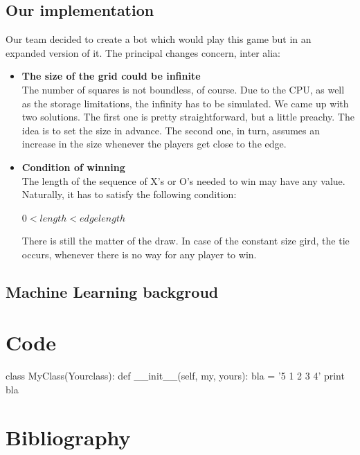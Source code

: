 \documentclass[a4paper,12pt]{book}
\begin{document}
	\section{Our implementation}
	Our team decided to create a bot which would play this game but in an expanded version of it. The principal changes concern, inter alia:\\
	\begin{itemize}
		\item \textbf{The size of the grid could be infinite}\\
		The number of squares is not boundless, of course. Due to the CPU, as well as the storage limitations, the infinity has to be simulated. We came up with two solutions. The first one is pretty straightforward, but a little preachy. The idea is to set the size in advance. The second one, in turn, assumes an increase in the size whenever the players get close to the edge.
		\item \textbf{Condition of winning}\\
		The length of the sequence of X's or O's needed to win may have any value. Naturally, it has to satisfy the following condition:
		\begin{center}
			$0 < length < edgelength$
		\end{center}
		There is still the matter of the draw. In case of the constant size gird, the tie occurs, whenever there is no way for any player to win.
	\end{itemize}
	\section{Machine Learning backgroud}
	\chapter{Code}
	\begin{python}
		class MyClass(Yourclass):
		def __init__(self, my, yours):
		bla = '5 1 2 3 4'
		print bla
	\end{python}
	\chapter{Bibliography}

	
	\backmatter
	
\end{document}
